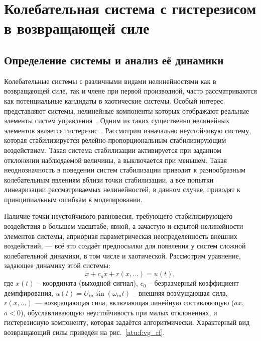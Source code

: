 
\FloatBarrier
\section{Колебательная система с гистерезисом в возвращающей силе} %
\label{atu:sect:vglass}


\subsection{Определение системы и анализ её динамики} %

Колебательные системы с различными видами нелинейностями
как в возвращающей силе, так и члене при первой производной,
часто рассматриваются как потенциальные кандидаты в хаотические системы.
Особый интерес представляют системы, нелинейные компоненты которых
отображают реальные элементы систем управления~\cite{atu_st85,atu_ISDMCI2013,atu_asau20}.
Одним из таких существенно нелинейных элементов
является гистерезис~\cite{sys_hyst,in_theory_mech_vibro,ivanov_alg_id_dyn_hyst,andronn_id_ns_hyst}.
Рассмотрим изначально неустойчивую  систему,
которая стабилизируется релейно-пропорциональным
стабилизирующим воздействием.
Такая система стабилизации активируется при заданном отклонении наблюдаемой
величины, а выключается при меньшем. Такая неоднозначность в поведении
систем стабилизации приводит к разнообразным колебательным явлениям вблизи
точки стабилизации, а все попытки линеаризации рассматриваемых
нелинейностей, в данном случае, приводят к принципиальным ошибкам в
моделировании.

Наличие точки неустойчивого равновесия, требующего стабилизирующего
воздействия в большем масштабе, явной, а зачастую и скрытой нелинейности
элементов системы, априорная параметрическая неопределенность внешних
воздействий, --- всё это создаёт предпосылки для появления у систем сложной
колебательной динамики, в том числе и хаотической.
Рассмотрим уравнение, задающее динамику этой системы:
%
\begin{equation}
  \ddot{x} + c_o \dot{x} + r( x, \ldots ) = u(t),
  \label{atu:eq:vglass}
\end{equation}
%
где
$x(t)$ -- координата (выходной сигнал),
$ c_0$ -- безразмерный коэффициент демпфирования,
$u(t) = U_{in} \sin( \omega_{in} t ) $ -- внешняя возмущающая сила,
$r( x, \ldots) $ --- возвращающая сила,
включающая линейную составляющую ($ax$, $a<0$),
обуславливающую неустойчивость при малых отклонениях,
и гистерезисную компоненту, которая задаётся алгоритмически.
Характерный вид возвращающий силы приведён на  рис.~\ref{atu:f:vg_rf}.

